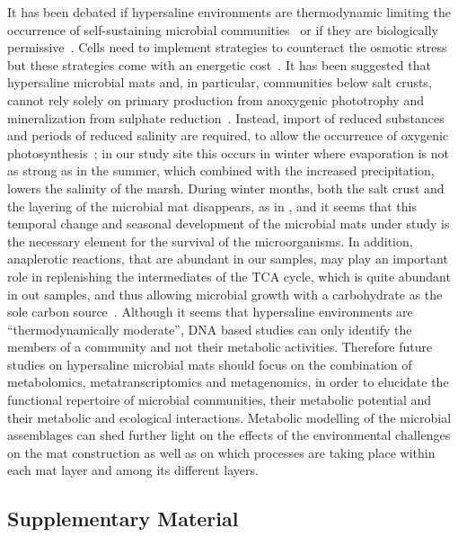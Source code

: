    It has been debated if hypersaline environments are thermodynamic limiting the occurrence of self-sustaining 
   microbial communities~\citep{oren_thermodynamic_2011} or if they are 
   biologically permissive~\citep{lee_nacl-saturated_2018}. 
   Cells need to implement strategies to counteract the osmotic stress~\citep{gunde-cimerman_strategies_2018} 
   but these strategies come with an energetic cost~\citep{meier_limitation_2021}. 
   It has been suggested that hypersaline microbial mats and, in particular, communities below salt crusts, 
   cannot rely solely on primary production from anoxygenic phototrophy and mineralization from sulphate reduction~\citep{meier_limitation_2021}. 
   Instead, import of reduced substances and periods of reduced salinity are required, 
   to allow the occurrence of oxygenic photosynthesis~\citep{meier_limitation_2021}; 
   in our study site this occurs in winter where evaporation is not as strong as in the summer, 
   which combined with the increased precipitation, lowers the salinity of the marsh. 
   During winter months, both the salt crust and the layering of the microbial mat disappears, as in \cite{cardoso_seasonal_2019}, 
   and it seems that this temporal change and seasonal development of the microbial mats under study is the necessary element for the survival of the microorganisms. 
   In addition, anaplerotic reactions, that are abundant in our samples, may play an important role in replenishing the intermediates of the TCA cycle, 
   which is quite abundant in out samples, and thus allowing microbial growth with a carbohydrate 
   as the sole carbon source~\citep{tong_structure_2013, choi_distinct_2016}. 
   Although it seems that hypersaline environments are “thermodynamically moderate”, DNA based studies can only identify 
   the members of a community and not their metabolic activities. 
   Therefore future studies on hypersaline microbial mats should focus on the combination of metabolomics, 
   metatranscriptomics and metagenomics, in order to elucidate the functional repertoire of microbial communities, 
   their metabolic potential and their metabolic and ecological interactions. 
   Metabolic modelling of the microbial assemblages can shed further light on the effects of the environmental 
   challenges on the mat construction as well as on which processes are taking place within each mat layer and 
   among its different layers.


\subsection*{Supplementary Material}
\label{swamp:suppl}   

